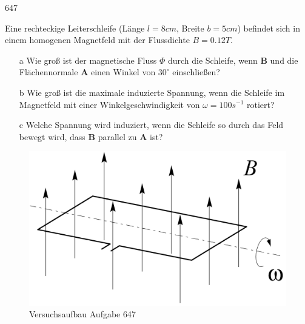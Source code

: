 \begin{auf}
    647
\end{auf}
Eine rechteckige Leiterschleife (Länge $l=8cm$, Breite $b=5cm$) befindet sich in einem homogenen Magnetfeld mit der Flussdichte $B=0.12T$.
\begin{enumerate}
    \item[a] Wie groß ist der magnetische Fluss $\Phi$ durch die Schleife, wenn \textbf{B} und die Flächennormale \textbf{A} einen Winkel von $30^\circ$ einschließen?
    \item[b] Wie groß ist die maximale induzierte Spannung, wenn die Schleife im Magnetfeld mit einer Winkelgeschwindigkeit von $\omega=100s^{-1}$ rotiert?
    \item[c] Welche Spannung wird induziert, wenn die Schleife so durch das Feld
    bewegt wird, dass \textbf{B} parallel zu \textbf{A} ist?
\end{enumerate}
\begin{figure}[h]
    \centering
    \includegraphics[width=0.7\linewidth]{images/647_0.png}
    \caption{Versuchsaufbau Aufgabe 647}
\end{figure}